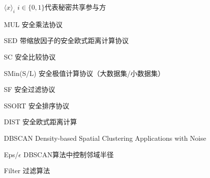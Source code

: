 \begin{denotation}
\item[$ \langle x \rangle_i $] $ i\in\{0,1\} $代表秘密共享参与方
\item[MUL] 安全乘法协议
\item[SED] 带缩放因子的安全欧式距离计算协议
\item[SC] 安全比较协议
\item[SMin(S/L)] 安全极值计算协议（大数据集/小数据集）
\item[SF] 安全过滤协议
\item[SSORT] 安全排序协议
\item[DIST] 安全欧式距离计算
\item[DBSCAN] Density-based Spatial Clustering Applications with Noise
\item[Eps/$ \epsilon $] DBSCAN算法中控制邻域半径
\item[Filter] 过滤算法
%	

\end{denotation}
